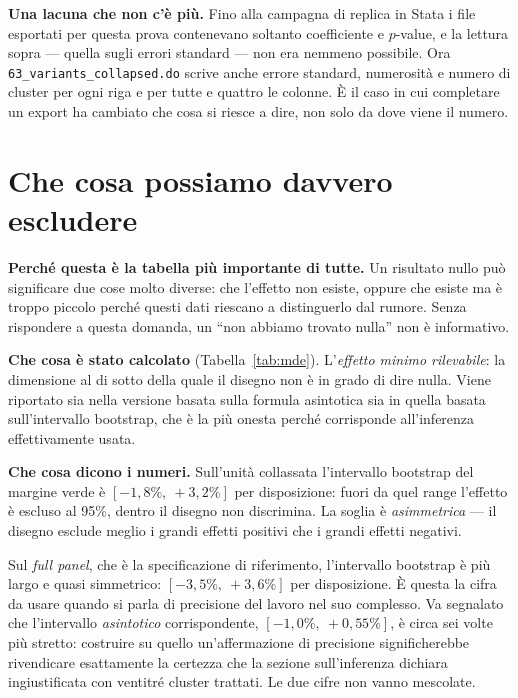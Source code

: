 \documentclass[11pt,a4paper]{article}
\begin{document}
\textbf{Una lacuna che non c'\`e pi\`u.} Fino alla campagna di replica in Stata i file
esportati per questa prova contenevano soltanto coefficiente e $p$-value, e la lettura sopra
--- quella sugli errori standard --- non era nemmeno possibile. Ora
\texttt{63\_variants\_collapsed.do} scrive anche errore standard, numerosit\`a e numero di
cluster per ogni riga e per tutte e quattro le colonne. \`E il caso in cui completare un
export ha cambiato che cosa si riesce a dire, non solo da dove viene il numero.



\clearpage
\section{Che cosa possiamo davvero escludere}

\textbf{Perch\'e questa \`e la tabella pi\`u importante di tutte.} Un risultato nullo pu\`o
significare due cose molto diverse: che l'effetto non esiste, oppure che esiste ma \`e
troppo piccolo perch\'e questi dati riescano a distinguerlo dal rumore. Senza rispondere a
questa domanda, un ``non abbiamo trovato nulla'' non \`e informativo.

\textbf{Che cosa \`e stato calcolato} (Tabella~\ref{tab:mde}). L'\emph{effetto minimo
rilevabile}: la dimensione al di sotto della quale il disegno non \`e in grado di dire
nulla. Viene riportato sia nella versione basata sulla formula asintotica sia in quella
basata sull'intervallo bootstrap, che \`e la pi\`u onesta perch\'e corrisponde
all'inferenza effettivamente usata.

\textbf{Che cosa dicono i numeri.} Sull'unit\`a collassata l'intervallo bootstrap del
margine verde \`e $[-1{,}8\%,\ +3{,}2\%]$ per disposizione: fuori da quel range l'effetto
\`e escluso al 95\%, dentro il disegno non discrimina. La soglia \`e \emph{asimmetrica} ---
il disegno esclude meglio i grandi effetti positivi che i grandi effetti negativi.

Sul \emph{full panel}, che \`e la specificazione di riferimento, l'intervallo bootstrap \`e
pi\`u largo e quasi simmetrico: $[-3{,}5\%,\ +3{,}6\%]$ per disposizione. \`E questa la
cifra da usare quando si parla di precisione del lavoro nel suo complesso. Va segnalato che
l'intervallo \emph{asintotico} corrispondente, $[-1{,}0\%,\ +0{,}55\%]$, \`e circa sei volte
pi\`u stretto: costruire su quello un'affermazione di precisione significherebbe rivendicare
esattamente la certezza che la sezione sull'inferenza dichiara ingiustificata con
ventitr\'e cluster trattati. Le due cifre non vanno mescolate.
\end{document}
